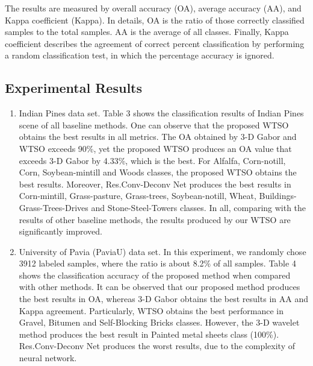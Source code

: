 \documentclass{ws-ijwmip}
\begin{document}
The results are measured by overall accuracy (OA), average accuracy (AA), and Kappa coefficient (Kappa). In details, OA is the ratio of those correctly classified samples to the total samples. AA is the average of all classes. 
Finally, Kappa coefficient describes the agreement of correct percent classification by performing a random classification test, in which the percentage accuracy is ignored.

\subsection{Experimental Results}
\begin{enumerate}
\item Indian Pines data set. 
Table 3 shows the classification results of Indian Pines scene of all baseline methods. One can observe that the proposed WTSO obtains the best results in all metrics. 
The OA obtained by 3-D Gabor and WTSO exceeds 90\%, yet the proposed WTSO produces an OA value that exceeds 3-D Gabor by 4.33\%, which is the best. 
For Alfalfa, Corn-notill, Corn, Soybean-mintill and Woods classes, the proposed WTSO obtains the best results. Moreover, Res.Conv-Deconv Net produces the best results in Corn-mintill, Grass-pasture, Grass-trees, Soybean-notill, Wheat, Buildings-Grass-Trees-Drives and Stone-Steel-Towers classes. 
In all, comparing with the results of other baseline methods, the results produced by our WTSO are significantly improved.


\item University of Pavia (PaviaU) data set. In this experiment, we randomly chose 3912 labeled samples, where the ratio is about 8.2\% of all samples. Table 4 shows the classification accuracy of the proposed method when compared with other methods. 
It can be observed that our proposed method produces the best results in OA, whereas 3-D Gabor obtains the best results in AA and Kappa agreement. 
Particularly, WTSO obtains the best performance in Gravel, Bitumen and Self-Blocking Bricks classes. However, the 3-D wavelet method produces the best result in Painted metal sheets class (100\%). Res.Conv-Deconv Net produces the worst results, due to the complexity of neural network.
\end{enumerate}
\end{document}
